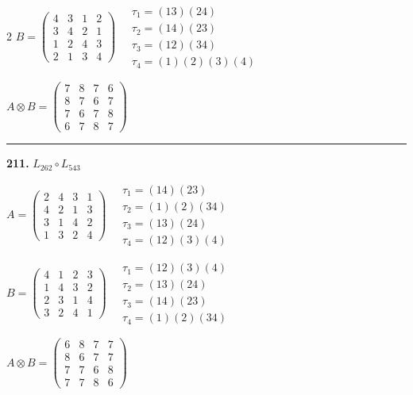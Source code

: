 \begin{multicols}{2}
$B = \begin{pmatrix} 4 & 3 & 1 & 2 \\ 3 & 4 & 2 & 1 \\ 1 & 2 & 4 & 3 \\ 2 & 1 & 3 & 4 \end{pmatrix} \quad \begin{matrix} \tau_{1}=(1 3)(2 4) \\ \tau_{2}=(1 4)(2 3) \\ \tau_{3}=(1 2)(3 4) \\ \tau_{4}=(1)(2)(3)(4) \end{matrix}$

$A \otimes B = \begin{pmatrix} 7 & 8 & 7 & 6 \\ 8 & 7 & 6 & 7 \\ 7 & 6 & 7 & 8 \\ 6 & 7 & 8 & 7 \end{pmatrix}$

\vspace{0.3em}
\hrule
\vspace{0.3em}

\noindent\textbf{211.} $L_{262} \circ L_{543}$

$A = \begin{pmatrix} 2 & 4 & 3 & 1 \\ 4 & 2 & 1 & 3 \\ 3 & 1 & 4 & 2 \\ 1 & 3 & 2 & 4 \end{pmatrix} \quad \begin{matrix} \tau_{1}=(1 4)(2 3) \\ \tau_{2}=(1)(2)(3 4) \\ \tau_{3}=(1 3)(2 4) \\ \tau_{4}=(1 2)(3)(4) \end{matrix}$

$B = \begin{pmatrix} 4 & 1 & 2 & 3 \\ 1 & 4 & 3 & 2 \\ 2 & 3 & 1 & 4 \\ 3 & 2 & 4 & 1 \end{pmatrix} \quad \begin{matrix} \tau_{1}=(1 2)(3)(4) \\ \tau_{2}=(1 3)(2 4) \\ \tau_{3}=(1 4)(2 3) \\ \tau_{4}=(1)(2)(3 4) \end{matrix}$

$A \otimes B = \begin{pmatrix} 6 & 8 & 7 & 7 \\ 8 & 6 & 7 & 7 \\ 7 & 7 & 6 & 8 \\ 7 & 7 & 8 & 6 \end{pmatrix}$


\end{multicols}
